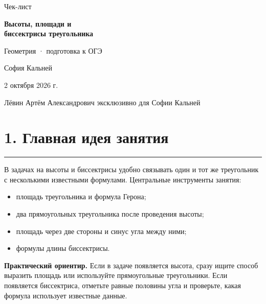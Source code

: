 \documentclass[a4paper,12pt]{article}
\newcommand{\sectionline}{\par\vspace{0.2em}\noindent\color{rulegray}\rule{\linewidth}{0.6pt}\par\color{textgray}\vspace{0.45em}}
\newcommand{\key}[1]{\textcolor{darkaccent}{\textbf{#1}}}
\newcommand{\lessondate}{2 октября 2026 г.}
\begin{document}
\color{textgray}

\thispagestyle{empty}
\begin{center}
\vspace*{25mm}
{\Large\color{softgray}Чек-лист}\par
\vspace{7mm}
{\fontsize{26}{31}\selectfont\bfseries\color{darkaccent}Высоты, площади и\\[2mm]биссектрисы треугольника}\par
\vspace{10mm}
{\large Геометрия · подготовка к ОГЭ}\par
\vspace{18mm}
{\large София Кальней}\par
\vspace{4mm}
{\normalsize \lessondate}\par
\vfill
{\small\color{softgray}Лёвин Артём Александрович эксклюзивно для Софии Кальней}\par
\vspace{8mm}
\end{center}
\clearpage

\section*{1. Главная идея занятия}
\sectionline
В задачах на высоты и биссектрисы удобно связывать один и тот же треугольник с несколькими известными формулами. Центральные инструменты занятия:
\begin{itemize}
  \item площадь треугольника и формула Герона;
  \item два прямоугольных треугольника после проведения высоты;
  \item площадь через две стороны и синус угла между ними;
  \item формулы длины биссектрисы.
\end{itemize}

\key{Практический ориентир.} Если в задаче появляется высота, сразу ищите способ выразить площадь или используйте прямоугольные треугольники. Если появляется биссектриса, отметьте равные половины угла и проверьте, какая формула использует известные данные.
\end{document}
